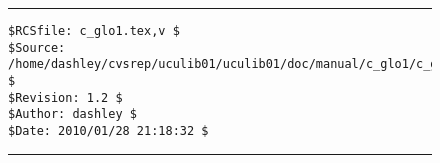 
\noindent\begin{figure}[!b]
\noindent\rule[-0.25in]{\textwidth}{1pt}
\begin{tiny}
\begin{verbatim}
$RCSfile: c_glo1.tex,v $
$Source: /home/dashley/cvsrep/uculib01/uculib01/doc/manual/c_glo1/c_glo1.tex,v $
$Revision: 1.2 $
$Author: dashley $
$Date: 2010/01/28 21:18:32 $
\end{verbatim}
\end{tiny}
\noindent\rule[0.25in]{\textwidth}{1pt}
\end{figure}

%
%

